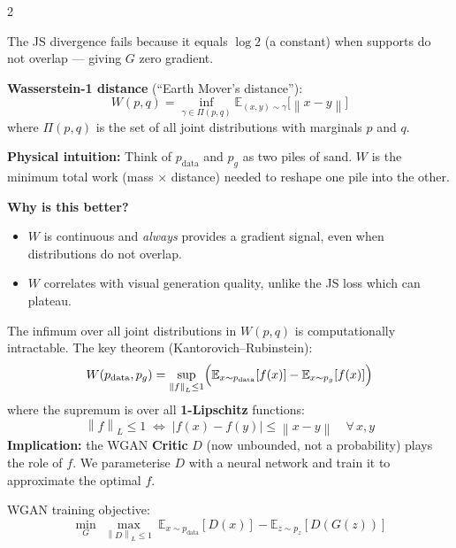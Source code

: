 \documentclass[10pt]{article}
\newcommand{\navybox}[2]{\begin{tcolorbox}[mybox={Navy}{LBg},title={#1}]#2\end{tcolorbox}}
\newcommand{\skybox}[2]{\begin{tcolorbox}[mybox={Sky}{BBg},title={#1}]#2\end{tcolorbox}}
\newcommand{\E}{\mathbb{E}}
\newcommand{\norm}[1]{\left\|#1\right\|}
\begin{document}
\begin{multicols}{2}

\navybox{A Better Distance Between Distributions}{%
The JS divergence fails because it equals $\log 2$ (a constant) when supports do not overlap --- giving $G$ zero gradient.

\textbf{Wasserstein-1 distance} (``Earth Mover's distance''):
\begin{equation*}
  W(p, q) = \inf_{\gamma \in \Pi(p,q)} \E_{(x,y)\sim\gamma}\bigl[\norm{x - y}\bigr]
\end{equation*}
where $\Pi(p,q)$ is the set of all joint distributions with marginals $p$ and $q$.

\textbf{Physical intuition:}
Think of $p_\text{data}$ and $p_g$ as two piles of sand.
$W$ is the minimum total work (mass $\times$ distance) needed to reshape one pile into the other.

\textbf{Why is this better?}
\begin{itemize}
  \item $W$ is continuous and \emph{always} provides a gradient signal, even when distributions do not overlap.
  \item $W$ correlates with visual generation quality, unlike the JS loss which can plateau.
\end{itemize}}

\skybox{Kantorovich--Rubinstein Duality --- Making $W$ Tractable}{%
The infimum over all joint distributions in $W(p,q)$ is computationally intractable.
The key theorem (Kantorovich--Rubinstein):
\begin{equation*}
  W(p_\text{data}, p_g)
  = \sup_{\norm{f}_L \leq 1}
    \Bigl(\E_{x \sim p_\text{data}}[f(x)] - \E_{x \sim p_g}[f(x)]\Bigr)
\end{equation*}
where the supremum is over all \textbf{1-Lipschitz} functions:
\begin{equation*}
  \norm{f}_L \leq 1 \;\Longleftrightarrow\; |f(x) - f(y)| \leq \norm{x - y}\quad\forall\,x,y
\end{equation*}
\textbf{Implication:} the WGAN \textbf{Critic} $D$ (now unbounded, not a probability) plays the role of $f$.
We parameterise $D$ with a neural network and train it to approximate the optimal $f$.

WGAN training objective:
\begin{equation*}
  \min_G\ \max_{\norm{D}_L \leq 1}\ \E_{x \sim p_\text{data}}[D(x)] - \E_{z \sim p_z}[D(G(z))]
\end{equation*}}


\end{multicols}
\end{document}
